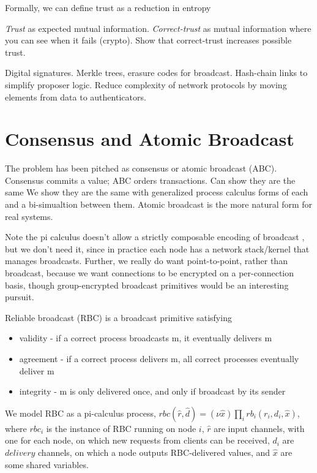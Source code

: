 Formally, we can define trust as a reduction in entropy 





\emph{Trust} as expected mutual information.
\emph{Correct-trust} as mutual information where you can see when it fails (crypto).
Show that correct-trust increases possible trust.

Digital signatures.
Merkle trees, erasure codes for broadcast.
Hash-chain links to simplify proposer logic.
Reduce complexity of network protocols by moving elements from data to authenticators.






\section{Consensus and Atomic Broadcast}
The problem has been pitched as consensus or atomic broadcast (ABC).
Consensus commits a value; ABC orders transactions.
Can show they are the same \cite{chandra1996unreliable}
We show they are the same with generalized process calculus forms of each and a bi-simualtion between them.
Atomic broadcast is the more natural form for real systems.

Note the pi calculus doesn't allow a strictly composable encoding of broadcast \cite{ene1999expressiveness},
but we don't need it, since in practice each node has a network stack/kernel that manages broadcasts.
Further, we really do want point-to-point, rather than broadcast,
because we want connections to be encrypted on a per-connection basis,
though group-encrypted broadcast primitives would be an interesting pursuit.

Reliable broadcast (RBC) is a broadcast primitive satisfying

\begin{itemize}
\item validity - if a correct process broadcasts m, it eventually delivers m
\item agreement - if a correct process delivers m, all correct processes eventually deliver m
\item integrity - m is only delivered once, and only if broadcast by its sender
\end{itemize}

We model RBC as a pi-calculus process, 
$rbc(\hat{r}, \hat{d}) = (\nu \hat{x}) \prod_i rb_i(r_i, d_i, \hat{x})$,
where $rbc_i$ is the instance of RBC running on node $i$, 
$\hat{r}$ are input channels, with one for each node, 
on which new requests from clients can be received, 
$d_i$ are $delivery$ channels, on which a node outputs RBC-delivered values,
and $\hat{x}$ are some shared variables.

